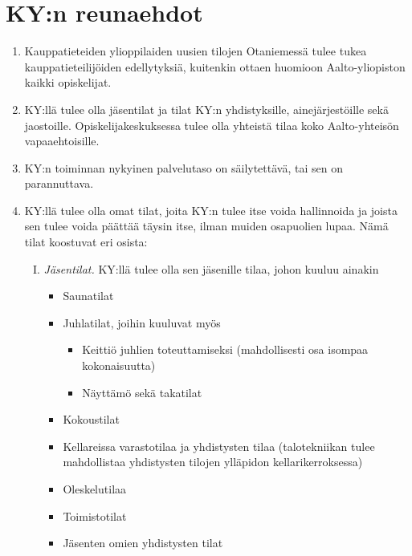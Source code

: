 \documentclass[a4paper, 12pt, finnish]{report}
\begin{document}
\section*{KY:n reunaehdot}
\begin{enumerate}
    \item{Kauppatieteiden ylioppilaiden uusien tilojen Otaniemessä tulee tukea kauppatieteilijöiden edellytyksiä, kuitenkin ottaen huomioon Aalto-yliopiston kaikki opiskelijat.}

    \item{KY:llä tulee olla jäsentilat ja tilat KY:n yhdistyksille, ainejärjestöille sekä jaostoille. Opiskelijakeskuksessa tulee olla yhteistä tilaa koko Aalto-yhteisön vapaaehtoisille.}

    \item{KY:n toiminnan nykyinen palvelutaso on säilytettävä, tai sen on parannuttava.}

    \item{KY:llä tulee olla omat tilat, joita KY:n tulee itse voida hallinnoida ja joista sen tulee voida päättää täysin itse, ilman muiden osapuolien lupaa. Nämä tilat koostuvat eri osista:}
        \begin{enumerate}[I.]
            \item{\textit{Jäsentilat.} KY:llä tulee olla sen jäsenille tilaa, johon kuuluu ainakin} 
                \begin{itemize}
                    \item{Saunatilat}
                    \item{Juhlatilat, joihin kuuluvat myös}
                        \begin{itemize}
                            \item{Keittiö juhlien toteuttamiseksi (mahdollisesti osa isompaa kokonaisuutta)}
                            \item{Näyttämö sekä takatilat}
                        \end{itemize}
                    \item{Kokoustilat}
                    \item{Kellareissa varastotilaa ja yhdistysten tilaa (talotekniikan tulee mahdollistaa yhdistysten tilojen ylläpidon kellarikerroksessa) }
                    \item{Oleskelutilaa}
                    \item{Toimistotilat}
                    \item{Jäsenten omien yhdistysten tilat}
                \end{itemize}


\end{enumerate}
\end{enumerate}
\end{document}
